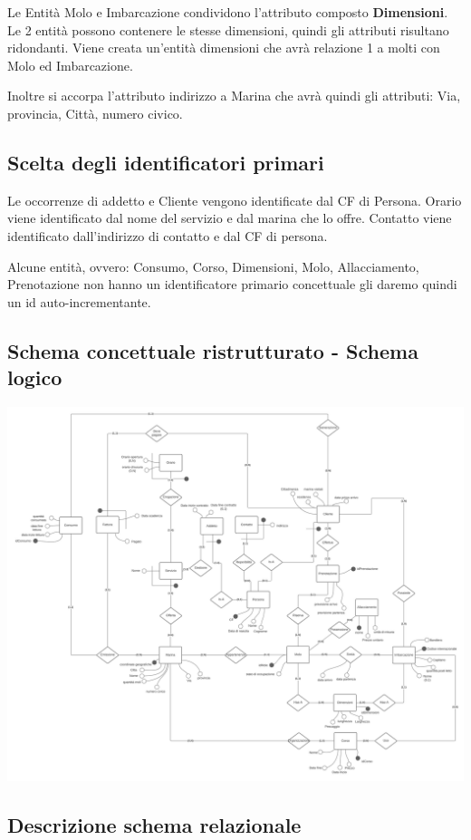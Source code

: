 Le Entità Molo e Imbarcazione condividono l'attributo composto \textbf{Dimensioni}. Le 2 entità possono contenere le stesse dimensioni, quindi gli attributi risultano ridondanti. Viene creata un'entità dimensioni che avrà relazione 1 a molti con Molo ed Imbarcazione.

Inoltre si accorpa l'attributo indirizzo a Marina che avrà quindi gli attributi: Via, provincia, Città, numero civico.

\subsection{Scelta degli identificatori primari}

Le occorrenze di addetto e Cliente vengono identificate dal CF di Persona. 
Orario viene identificato dal nome del servizio e dal marina che lo offre.
Contatto viene identificato dall'indirizzo di contatto e dal CF di persona.

Alcune entità, ovvero: Consumo, Corso, Dimensioni, Molo, Allacciamento, Prenotazione non hanno un identificatore primario concettuale gli daremo quindi un id auto-incrementante.

\subsection{Schema concettuale ristrutturato - Schema logico}
\includegraphics[width=\textwidth]{img/erlogico.png}


\subsection{Descrizione schema relazionale}

